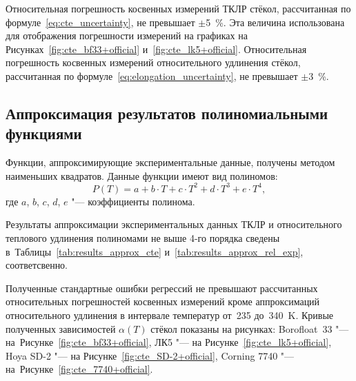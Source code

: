 Относительная погрешность косвенных измерений ТКЛР стёкол, рассчитанная по
формуле~\eqref{eq:cte_uncertainty}, не превышает ${\pm}$5~\%.
Эта величина использована для отображения погрешности измерений на графиках на
Рисунках~\ref{fig:cte_bf33+official} и~\ref{fig:cte_lk5+official}.
Относительная погрешность косвенных измерений относительного удлинения стёкол,
рассчитанная по формуле~\eqref{eq:elongation_uncertainty}, не превышает
${\pm}$3~\%.

\subsection{Аппроксимация результатов полиномиальными функциями}
Функции, аппроксимирующие экспериментальные данные, получены методом наименьших квадратов. Данные функции имеют вид полиномов:
\begin{equation}\label{eq:polynom_sample}
    P(T) = a + b \cdot T + c \cdot T^2 + d \cdot T^3 + e \cdot T^4,
\end{equation}
где $a$, $b$, $c$, $d$, $e$ "--- коэффициенты полинома.

Результаты аппроксимации экспериментальных данных ТКЛР и относительного
теплового удлинения полиномами не выше 4-го порядка сведены
в~Таблицы~\ref{tab:results_approx_cte} и~\ref{tab:results_approx_rel_exp},
соответсвенно.

Полученные стандартные ошибки регрессий не превышают рассчитанных относительных
погрешностей косвенных измерений кроме аппроксимаций относительного удлинения в
интервале температур от~235 до~340~K. Кривые полученных зависимостей $\alpha(T)$
стёкол показаны на рисунках: Borofloat~33 "---
на~Рисунке~\ref{fig:cte_bf33+official}, ЛК5 "--- на Рисунке~\ref{fig:cte_lk5+official},
Hoya SD-2 "--- на Рисунке~\ref{fig:cte_SD-2+official}, Corning 7740 "---
на~Рисунке~\ref{fig:cte_7740+official}.


